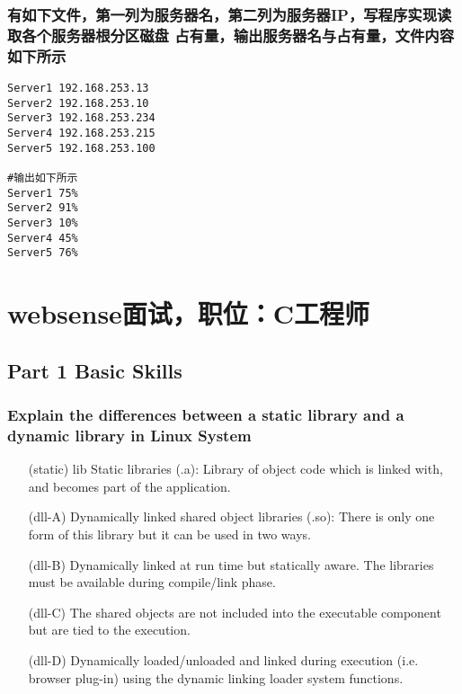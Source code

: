 \documentclass{article}
\begin{document}
\subsubsection{有如下文件，第一列为服务器名，第二列为服务器IP，写程序实现读取各个服务器根分区磁盘
占有量，输出服务器名与占有量，文件内容如下所示}
\begin{verbatim}
Server1 192.168.253.13
Server2 192.168.253.10
Server3 192.168.253.234
Server4 192.168.253.215
Server5 192.168.253.100

#输出如下所示
Server1 75%
Server2 91%
Server3 10%
Server4 45%
Server5 76%
\end{verbatim}



\section{websense面试，职位：C工程师}
\subsection{Part 1 Basic Skills}
\subsubsection{Explain the differences between a static library and a dynamic library in Linux System}
\begin{itemize}
\item[(static) lib]Static libraries (.a): Library of object code which is linked with, and becomes part of the application.
\item[(dll-A)]Dynamically linked shared object libraries (.so): There is only one form of this library but it can be used in two ways.
\item[(dll-B)]Dynamically linked at run time but statically aware. The libraries must be available during compile/link phase. 
\item[(dll-C)]The shared objects are not included into the executable component but are tied to the execution.
\item[(dll-D)]Dynamically loaded/unloaded and linked during execution (i.e. browser plug-in) using the dynamic linking loader system functions.
\end{itemize}
\end{document}

